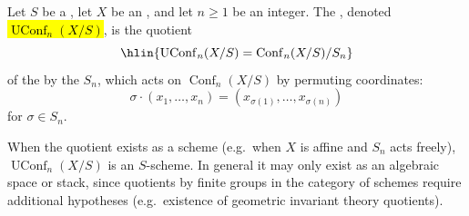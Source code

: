 \begin{definition} \label{definition:unordered_configuration_space_of_n_points_in_a_scheme_over_a_scheme}
Let $S$ be a , let $X$ be an , and let $n \geq 1$ be an integer. The , denoted \hl{$\operatorname{UConf}_n(X/S)$}, is the quotient
$$\hlin{\operatorname{UConf}_n(X/S) = \operatorname{Conf}_n(X/S) / S_n}$$
of the  by the  $S_n$, which acts on $\operatorname{Conf}_n(X/S)$ by permuting coordinates:
$$\sigma \cdot (x_1, \dots, x_n) = (x_{\sigma(1)}, \dots, x_{\sigma(n)})$$
for $\sigma \in S_n$.

When the quotient exists as a scheme (e.g.\ when $X$ is affine and $S_n$ acts freely), $\operatorname{UConf}_n(X/S)$ is an $S$-scheme. In general it may only exist as an algebraic space or stack, since quotients by finite groups in the category of schemes require additional hypotheses (e.g.\ existence of geometric invariant theory quotients).
\end{definition}
